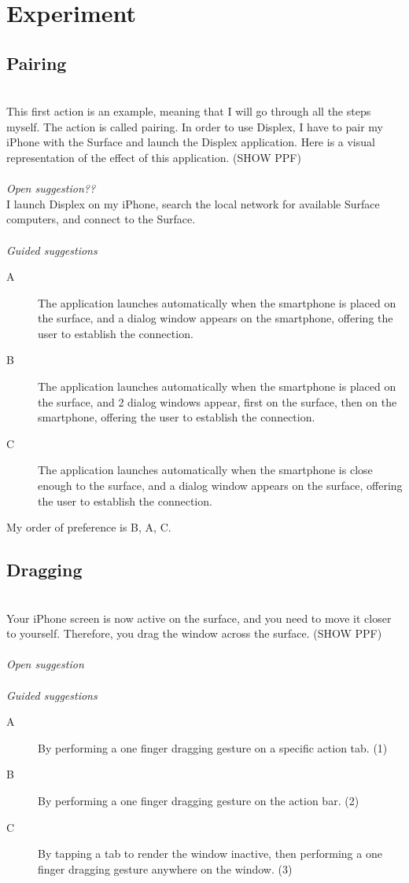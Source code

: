 

\section{Experiment}

\subsection{Pairing}
\hfill\\
This first action is an example, meaning that I will go through all the steps myself.
The action is called pairing.
In order to use Displex, I have to pair my iPhone with the Surface and launch the Displex application. Here is a visual representation of the effect of this application.
(SHOW PPF)
\\\\
\emph{Open suggestion??}\\
I launch Displex on my iPhone, search the local network for available Surface computers, and connect to the Surface.
\\\\
\emph{Guided suggestions}
\begin{description}
\item[A]{The application launches automatically when the smartphone is placed on the surface, and a dialog window appears on the smartphone, offering the user to establish the connection.}
\item[B]{The application launches automatically when the smartphone is placed on the surface, and 2 dialog windows appear, first on the surface, then on the smartphone, offering the user to establish the connection.}
\item[C]{The application launches automatically when the smartphone is close enough to the surface, and a dialog window appears on the surface, offering the user to establish the connection.}
\end{description}

My order of preference is B, A, C.


\subsection{Dragging}
\hfill\\
Your iPhone screen is now active on the surface, and you need to move it closer to yourself. Therefore, you drag the window across the surface.
(SHOW PPF)
\\\\
\emph{Open suggestion}
\\\\
\emph{Guided suggestions}
\begin{description}
\item[A]{By performing a one finger dragging gesture on a specific action tab. (1)}
\item[B]{By performing a one finger dragging gesture on the action bar. (2)}
\item[C]{By tapping a tab to render the window inactive, then performing a one finger dragging gesture anywhere on the window. (3)}
\end{description}

